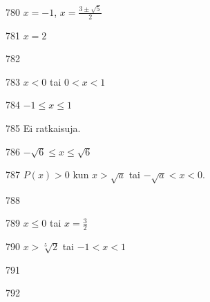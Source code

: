 \begin{Vastaus}{780}
		$x = -1$, $x = \frac{3\pm \sqrt{5}}{2}$
	
\end{Vastaus}
\begin{Vastaus}{781}
	$x=2$
	
\end{Vastaus}
\begin{Vastaus}{782}
    
\end{Vastaus}
\begin{Vastaus}{783}
        $x<0$ tai $0<x<1$
    
\end{Vastaus}
\begin{Vastaus}{784}
        $-1 \le x \le 1$
    
\end{Vastaus}
\begin{Vastaus}{785}
        Ei ratkaisuja.
    
\end{Vastaus}
\begin{Vastaus}{786}
        $-\sqrt{6}\le x \le \sqrt{6}$
    
\end{Vastaus}
\begin{Vastaus}{787}
	$P(x)>0$ kun $x > \sqrt{a}$ tai $-\sqrt{a}<x<0$.
    
\end{Vastaus}
\begin{Vastaus}{788}
    
\end{Vastaus}
\begin{Vastaus}{789}
        $x\le0$ tai $x=\frac{3}{2}$
    
\end{Vastaus}
\begin{Vastaus}{790}
$x > \sqrt[5]{2}$ tai $-1<x<1$
\end{Vastaus}
\begin{Vastaus}{791}
\end{Vastaus}
\begin{Vastaus}{792}
    
\end{Vastaus}
